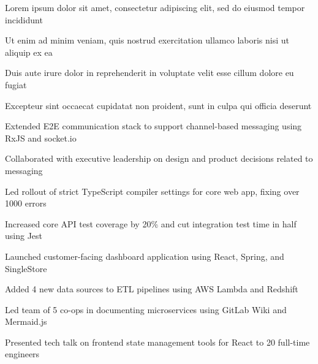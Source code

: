 \documentclass[]{deedy-resume}
\begin{document}
\begin{tightemize}
\item Lorem ipsum dolor sit amet, consectetur adipiscing elit, sed do eiusmod tempor incididunt
\item Ut enim ad minim veniam, quis nostrud exercitation ullamco laboris nisi ut aliquip ex ea
\item Duis aute irure dolor in reprehenderit in voluptate velit esse cillum dolore eu fugiat
\item Excepteur sint occaecat cupidatat non proident, sunt in culpa qui officia deserunt
\end{tightemize}
\sectionsep

\begin{tightemize}
\item Extended E2E communication stack to support channel-based messaging using RxJS and socket.io
\item Collaborated with executive leadership on design and product decisions related to messaging
\item Led rollout of strict TypeScript compiler settings for core web app, fixing over 1000 errors 
\item Increased core API test coverage by 20\% and cut integration test time in half using Jest 
\end{tightemize}
\sectionsep

\begin{tightemize}
\item Launched customer-facing dashboard application using React, Spring, and SingleStore
\item Added 4 new data sources to ETL pipelines using AWS Lambda and Redshift
\item Led team of 5 co-ops in documenting microservices using GitLab Wiki and Mermaid.js
\item Presented tech talk on frontend state management tools for React to 20 full-time engineers
\end{tightemize}
\sectionsep

\end{document}
